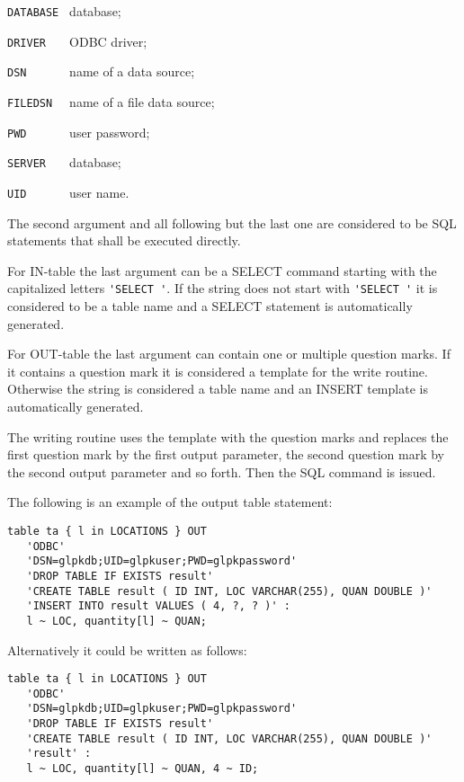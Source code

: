 \documentclass[11pt,draft]{article}
\begin{document}
\verb|DATABASE | database;

\verb|DRIVER   | ODBC driver;

\verb|DSN      | name of a data source;

\verb|FILEDSN  | name of a file data source;

\verb|PWD      | user password;

\verb|SERVER   | database;

\verb|UID      | user name.

The second argument and all following but the last one are considered
to be SQL statements that shall be executed directly.

For IN-table the last argument can be a SELECT command starting with
the capitalized letters \verb|'SELECT '|. If the string does not start
with \verb|'SELECT '| it is considered to be a table name and a SELECT
statement is automatically generated.

For OUT-table the last argument can contain one or multiple question
marks. If it contains a question mark it is considered a template for
the write routine. Otherwise the string is considered a table name and
an INSERT template is automatically generated.

The writing routine uses the template with the question marks and
replaces the first question mark by the first output parameter, the
second question mark by the second output parameter and so forth. Then
the SQL command is issued.

The following is an example of the output table statement:

\begin{small}
\begin{verbatim}
table ta { l in LOCATIONS } OUT 
   'ODBC'
   'DSN=glpkdb;UID=glpkuser;PWD=glpkpassword'
   'DROP TABLE IF EXISTS result'
   'CREATE TABLE result ( ID INT, LOC VARCHAR(255), QUAN DOUBLE )'
   'INSERT INTO result VALUES ( 4, ?, ? )' :
   l ~ LOC, quantity[l] ~ QUAN;
\end{verbatim}
\end{small}

\noindent
Alternatively it could be written as follows:

\begin{small}
\begin{verbatim}
table ta { l in LOCATIONS } OUT 
   'ODBC'
   'DSN=glpkdb;UID=glpkuser;PWD=glpkpassword'
   'DROP TABLE IF EXISTS result'
   'CREATE TABLE result ( ID INT, LOC VARCHAR(255), QUAN DOUBLE )'
   'result' :
   l ~ LOC, quantity[l] ~ QUAN, 4 ~ ID;
\end{verbatim}
\end{small}
\end{document}
